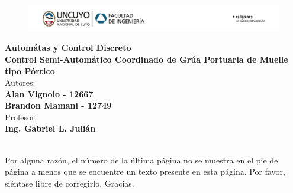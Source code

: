 \documentclass{article}
\begin{document}
\begin{titlepage}
    \centering
    \begin{figure}[h]
        \centering
        \includegraphics[width=1\textwidth]{encabezado.png}
    \end{figure}
    \vspace*{3cm}
    \huge{\textbf{Automátas y Control Discreto}}\\
    \vspace*{3cm}
    \Huge\textbf{Control Semi-Automático Coordinado de Grúa Portuaria de Muelle tipo Pórtico}\\
    \vspace*{6cm}
    \large{Autores:}\\
    \large{\textbf{Alan Vignolo - 12667\\Brandon Mamani - 12749}}\\
    \vspace*{1cm}
    \large{Profesor:}\\
    \large{\textbf{Ing. Gabriel L. Julián}}\\
    \vfill
    \the\year\\ %
\end{titlepage}


\tableofcontents
{}

\newpage











Por alguna razón, el número de la última página no se muestra en el pie de página
a menos que se encuentre un texto presente en esta página. 
Por favor, siéntase libre de corregirlo. Gracias.

\label{LastPage}
\end{document}
